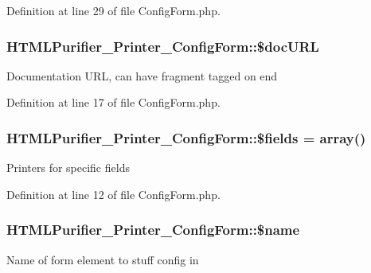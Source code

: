 Definition at line 29 of file Config\+Form.\+php.

\hypertarget{classHTMLPurifier__Printer__ConfigForm_a02e9e17aec27b9667972ff71e990ff55}{
\subsubsection[{\$doc\+U\+R\+L}]{\setlength{\rightskip}{0pt plus 5cm}H\+T\+M\+L\+Purifier\+\_\+\+Printer\+\_\+\+Config\+Form\+::\$doc\+U\+R\+L\hspace{0.3cm}{\ttfamily [protected]}}}\label{classHTMLPurifier__Printer__ConfigForm_a02e9e17aec27b9667972ff71e990ff55}
Documentation U\+R\+L, can have fragment tagged on end 

Definition at line 17 of file Config\+Form.\+php.

\hypertarget{classHTMLPurifier__Printer__ConfigForm_abca6158a6f2327f831ec219859d71b2f}{
\subsubsection[{\$fields}]{\setlength{\rightskip}{0pt plus 5cm}H\+T\+M\+L\+Purifier\+\_\+\+Printer\+\_\+\+Config\+Form\+::\$fields = array()\hspace{0.3cm}{\ttfamily [protected]}}}\label{classHTMLPurifier__Printer__ConfigForm_abca6158a6f2327f831ec219859d71b2f}
Printers for specific fields 

Definition at line 12 of file Config\+Form.\+php.

\hypertarget{classHTMLPurifier__Printer__ConfigForm_a387d1ddf6544c4a3521adfce90de9ee0}{
\subsubsection[{\$name}]{\setlength{\rightskip}{0pt plus 5cm}H\+T\+M\+L\+Purifier\+\_\+\+Printer\+\_\+\+Config\+Form\+::\$name\hspace{0.3cm}{\ttfamily [protected]}}}\label{classHTMLPurifier__Printer__ConfigForm_a387d1ddf6544c4a3521adfce90de9ee0}
Name of form element to stuff config in 

